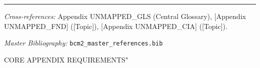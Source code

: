 \vspace{1em}
\hrule
\vspace{0.5em}

\noindent\textit{Cross-references:} 
Appendix UNMAPPED_GLS (Central Glossary), 
[Appendix UNMAPPED_FND] ([Topic]), 
[Appendix UNMAPPED_CIA] ([Topic]).

\noindent\textit{Master Bibliography:} \texttt{bcm2\_master\_references.bib}





CORE APPENDIX REQUIREMENTS"
%

